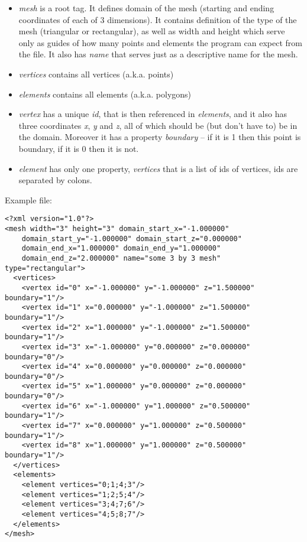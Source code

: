 \documentclass[a4paper,12pt]{article}
\begin{document}
\begin{itemize}

  \item \emph{mesh} is a root tag. It defines domain of the mesh (starting and ending coordinates of each of 3
  dimensions). It contains definition of the type of the mesh (triangular or rectangular), as well as width and height
  which serve only as guides of how many points and elements the program can expect from the file. It also has
  \emph{name} that serves just as a descriptive name for the mesh.

  \item \emph{vertices} contains all vertices (a.k.a. points)

  \item \emph{elements} contains all elements (a.k.a. polygons)

  \item \emph{vertex} has a unique \emph{id}, that is then referenced in \emph{elements}, and it also has three coordinates
  \emph{x}, \emph{y} and \emph{z}, all of which should be (but don't have to) be in the domain. Moreover it has a
  property \emph{boundary} -- if it is 1 then this point is boundary, if it is 0 then it is not.

  \item \emph{element} has only one property, \emph{vertices} that is a list of ids of vertices, ids are separated by
  colons.

\end{itemize}

Example file:

\begin{verbatim}
<?xml version="1.0"?>
<mesh width="3" height="3" domain_start_x="-1.000000"
    domain_start_y="-1.000000" domain_start_z="0.000000"
    domain_end_x="1.000000" domain_end_y="1.000000"
    domain_end_z="2.000000" name="some 3 by 3 mesh" type="rectangular">
  <vertices>
    <vertex id="0" x="-1.000000" y="-1.000000" z="1.500000" boundary="1"/>
    <vertex id="1" x="0.000000" y="-1.000000" z="1.500000" boundary="1"/>
    <vertex id="2" x="1.000000" y="-1.000000" z="1.500000" boundary="1"/>
    <vertex id="3" x="-1.000000" y="0.000000" z="0.000000" boundary="0"/>
    <vertex id="4" x="0.000000" y="0.000000" z="0.000000" boundary="0"/>
    <vertex id="5" x="1.000000" y="0.000000" z="0.000000" boundary="0"/>
    <vertex id="6" x="-1.000000" y="1.000000" z="0.500000" boundary="1"/>
    <vertex id="7" x="0.000000" y="1.000000" z="0.500000" boundary="1"/>
    <vertex id="8" x="1.000000" y="1.000000" z="0.500000" boundary="1"/>
  </vertices>
  <elements>
    <element vertices="0;1;4;3"/>
    <element vertices="1;2;5;4"/>
    <element vertices="3;4;7;6"/>
    <element vertices="4;5;8;7"/>
  </elements>
</mesh>
\end{verbatim}
\end{document}
